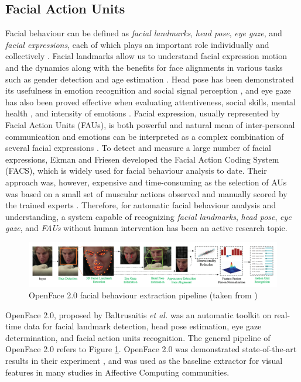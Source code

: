 \subsection{Facial Action Units}

Facial behaviour can be defined as \textit{facial landmarks}, \textit{head pose}, \textit{eye gaze}, and \textit{facial expressions}, each of which plays an important role individually and collectively \cite{baltrusaitis2018}. Facial landmarks allow us to understand facial expression motion and the dynamics along with the benefits for face alignments in various tasks such as gender detection and age estimation \cite{fu2010age}. Head pose has been demonstrated its usefulness in emotion recognition and social signal perception \cite{adams2015}, and eye gaze has also been proved effective when evaluating attentiveness, social skills, mental health \cite{vail2017}, and intensity of emotions \cite{kleinke1986}. Facial expression, usually represented by Facial Action Units (FAUs), is both powerful and natural mean of inter-personal communication and emotions can be interpreted as a complex combination of several facial expressions \cite{ekman2013}. To detect and measure a large number of facial expressions, Ekman and Friesen \cite{ekman1976} developed the Facial Action Coding System (FACS), which is widely used for facial behaviour analysis to date. Their approach was, however, expensive and time-consuming as the selection of AUs was based on a small set of muscular actions observed and manually scored by the trained experts \cite{ekman1976}. Therefore, for automatic facial behaviour analysis and understanding, a system capable of recognizing \textit{facial landmarks}, \textit{head pose}, \textit{eye gaze}, and \textit{FAUs} without human intervention has been an active research topic.


\begin{figure}[ht]
    \centering
    \includegraphics[width=1.1\textwidth]{images/background/openface.png}
    \caption[OpenFace 2.0 facial behaviour extraction pipeline]{OpenFace 2.0 facial behaviour extraction pipeline (taken from \cite{baltrusaitis2018})}
    \label{fig:openface}
\end{figure}


OpenFace 2.0, proposed by Baltrusaitis \textit{et al.} \cite{baltrusaitis2018} was an automatic toolkit on real-time data for facial landmark detection, head pose estimation, eye gaze determination, and facial action units recognition. The general pipeline of OpenFace 2.0 refers to Figure \ref{fig:openface}. OpenFace 2.0 was demonstrated state-of-the-art results in their experiment \cite{baltrusaitis2018}, and was used as the baseline extractor for visual features in many studies in Affective Computing communities. 




